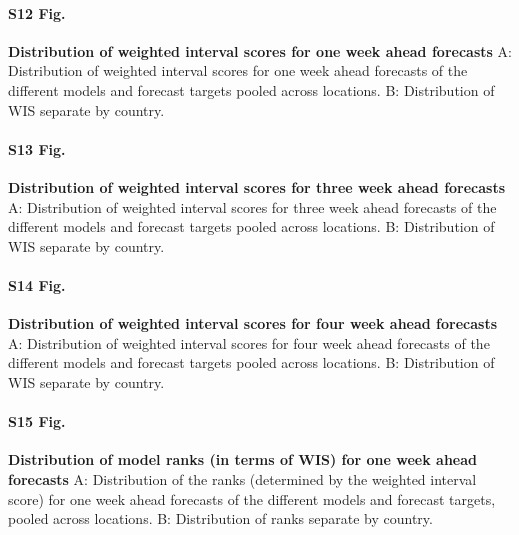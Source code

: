 \documentclass[10pt,letterpaper]{article}
\begin{document}
\paragraph{S12 Fig.}
\label{fig:distribution-scores-1}

\textbf{Distribution of weighted interval scores for one week ahead forecasts}
A: Distribution of weighted interval scores for one week ahead forecasts
of the different models and forecast targets pooled across locations. B:
Distribution of WIS separate by country.

\paragraph{S13 Fig.}
\label{A: Distribution of weighted interval scores for three week ahead forecasts of the different models and forecast targets pooled across locations. B: Distribution of WIS separate by country.}

\textbf{Distribution of weighted interval scores for three week ahead forecasts}
A: Distribution of weighted interval scores for three week ahead
forecasts of the different models and forecast targets pooled across
locations. B: Distribution of WIS separate by country.

\paragraph{S14 Fig.}
\label{A: Distribution of weighted interval scores for four week ahead forecasts of the different models and forecast targets pooled across locations. B: Distribution of WIS separate by country.}

\textbf{Distribution of weighted interval scores for four week ahead forecasts}
A: Distribution of weighted interval scores for four week ahead
forecasts of the different models and forecast targets pooled across
locations. B: Distribution of WIS separate by country.

\paragraph{S15 Fig.}
\label{fig:distribution-scores-ranks-1}

\textbf{Distribution of model ranks (in terms of WIS) for one week ahead forecasts}
A: Distribution of the ranks (determined by the weighted interval score)
for one week ahead forecasts of the different models and forecast
targets, pooled across locations. B: Distribution of ranks separate by
country.
\end{document}
